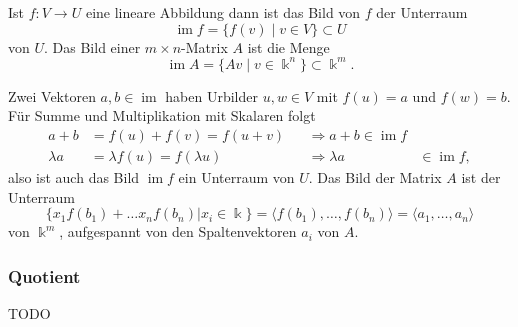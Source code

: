 \begin{definition}
Ist $f\colon V\to U$ eine lineare Abbildung dann ist das Bild von $f$
der Unterraum 
\[
\operatorname{im}f = \{ f(v)\;|\;v\in V\} \subset U
\]
von $U$.
Das Bild einer $m\times n$-Matrix $A$ ist die Menge
\[
\operatorname{im}A = \{ Av \;|\; v\in\Bbbk^n\} \subset \Bbbk^m.
\]
\end{definition}

Zwei Vektoren $a,b\in\operatorname{im}$ haben Urbilder $u,w\in V$ mit
$f(u)=a$ und $f(w)=b$.
Für Summe und Multiplikation mit Skalaren folgt
\[
\begin{aligned}
a+b&= f(u)+f(v)=f(u+v) &&\Rightarrow a+b\in\operatorname{im}f\\
\lambda a&=\lambda f(u) = f(\lambda u) &&\Rightarrow \lambda a&\in\operatorname{im}f,
\end{aligned}
\]
also ist auch das Bild $\operatorname{im}f$ ein Unterraum von $U$.
Das Bild der Matrix $A$ ist der Unterraum
\[
\{ x_1f(b_1) + \dots x_n f(b_n) | x_i\in\Bbbk\}
=
\langle f(b_1),\dots,f(b_n)\rangle
=
\langle a_1,\dots,a_n\rangle
\]
von $\Bbbk^m$, aufgespannt von den Spaltenvektoren $a_i$ von $A$.

\subsubsection{Quotient}
TODO
